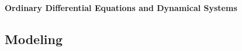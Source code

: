 \documentclass[10pt]{article}
\begin{document}
\footnotesize

\begin{center}
     \Large{\textbf{Ordinary Differential Equations and Dynamical Systems}} \\
\end{center}
\begin{multicols}{2}
\setlength{\premulticols}{1pt}
\setlength{\postmulticols}{1pt}
\setlength{\multicolsep}{1pt}
\setlength{\columnsep}{2pt}
\raggedbottom

\part{Modeling}











\end{multicols}
\end{document}
